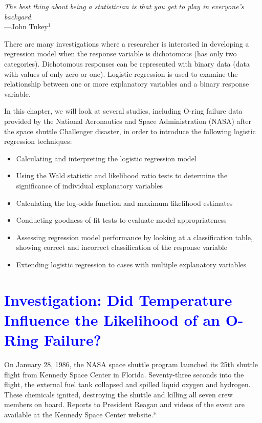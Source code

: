 \documentclass[
]{report}
\begin{document}
\begin{flushright}
\emph{The best thing about being a statistician is that you get to play in everyone’s backyard.} \\
—John Tukey$^1$
\end{flushright}

There are many investigations where a researcher is interested in developing a regression model when the response variable is dichotomous (has only two categories). Dichotomous responses can be represented with binary data (data with values of only zero or one). Logistic regression is used to examine the relationship between one or more explanatory variables and a binary response variable.

In this chapter, we will look at several studies, including O-ring failure data provided by the National Aeronautics and Space Administration (NASA) after the space shuttle Challenger disaster, in order to introduce the following logistic regression techniques:
\vspace{-1em}

\begin{itemize}
\item Calculating and interpreting the logistic regression model  
\item Using the Wald statistic and likelihood ratio tests to determine the significance of individual explanatory variables  
\item Calculating the log-odds function and maximum likelihood estimates  
\item Conducting goodness-of-fit tests to evaluate model appropriateness  
\item Assessing regression model performance by looking at a classification table, showing correct and incorrect classification of the response variable  
\item Extending logistic regression to cases with multiple explanatory variables 
\end{itemize}

\newpage

\hypertarget{section-60}{%
\section{\texorpdfstring{\textcolor{blue}{ Investigation: Did Temperature Influence the Likelihood of an O-Ring Failure?}}{}}\label{section-60}}

On January 28, 1986, the NASA space shuttle program launched its 25th shuttle flight from Kennedy Space Center in Florida. Seventy-three seconds into the flight, the external fuel tank collapsed and spilled liquid oxygen and hydrogen. These chemicals ignited, destroying the shuttle and killing all seven crew members on board. Reports to President Reagan and videos of the event are available at the Kennedy Space Center website.*
\end{document}
